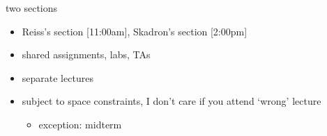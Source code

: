 \begin{frame}{two sections}
    \begin{itemize}
        \item Reiss's section [11:00am], Skadron's section [2:00pm]
        \item shared assignments, labs, TAs
        \item separate lectures
        \vspace{.5cm}
        \item subject to space constraints, I don't care if you attend `wrong' lecture
            \begin{itemize}
            \item exception: midterm
            \end{itemize}
    \end{itemize}
\end{frame}
